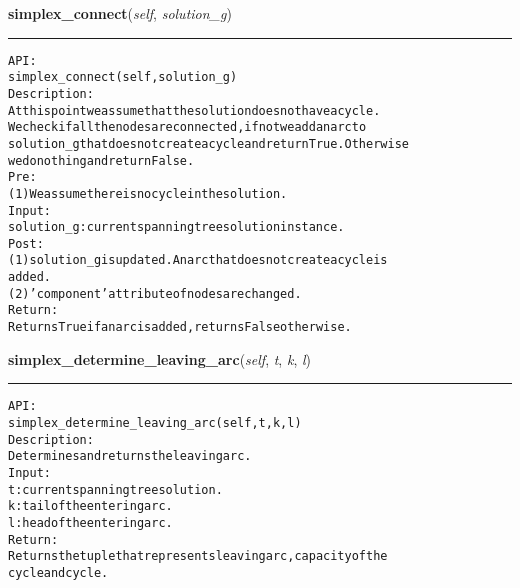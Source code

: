 \hspace{.8\funcindent}\begin{boxedminipage}{\funcwidth}

    \raggedright \textbf{simplex\_connect}(\textit{self}, \textit{solution\_g})

    \vspace{-1.5ex}

    \rule{\textwidth}{0.5\fboxrule}
\setlength{\parskip}{2ex}
\begin{alltt}

API:
    simplex\_connect(self, solution\_g)
Description:
    At this point we assume that the solution does not have a cycle.
    We check if all the nodes are connected, if not we add an arc to
    solution\_g that does not create a cycle and return True. Otherwise
    we do nothing and return False.
Pre:
    (1) We assume there is no cycle in the solution.
Input:
    solution\_g: current spanning tree solution instance.
Post:
    (1) solution\_g is updated. An arc that does not create a cycle is
    added.
    (2) 'component' attribute of nodes are changed.
Return:
    Returns True if an arc is added, returns False otherwise.
\end{alltt}

\setlength{\parskip}{1ex}
    \end{boxedminipage}

    \label{coinor:gimpy:graph:Graph:simplex_determine_leaving_arc}

    \vspace{0.5ex}

\hspace{.8\funcindent}\begin{boxedminipage}{\funcwidth}

    \raggedright \textbf{simplex\_determine\_leaving\_arc}(\textit{self}, \textit{t}, \textit{k}, \textit{l})

    \vspace{-1.5ex}

    \rule{\textwidth}{0.5\fboxrule}
\setlength{\parskip}{2ex}
\begin{alltt}

API:
    simplex\_determine\_leaving\_arc(self, t, k, l)
Description:
    Determines and returns the leaving arc.
Input:
    t: current spanning tree solution.
    k: tail of the entering arc.
    l: head of the entering arc.
Return:
    Returns the tuple that represents leaving arc, capacity of the
    cycle and cycle.
\end{alltt}

\setlength{\parskip}{1ex}
    \end{boxedminipage}

